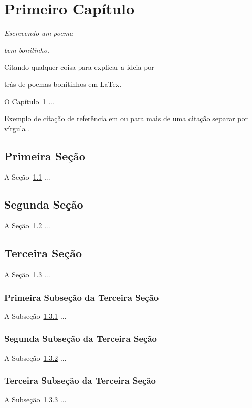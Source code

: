 \chapter{Primeiro Capítulo}
\label{cap:primeiro} 		%

\begin{flushright}	%
	\small
	\textit{Escrevendo um poema}
	
	\vspace{-3mm}
	\textit{bem bonitinho.}
		
	\vspace{-3mm} Citando qualquer coisa para explicar a ideia por
	
	\vspace{-3mm} trás de poemas bonitinhos em LaTex.
\end{flushright}

O Capítulo~\ref{cap:primeiro} ...

Exemplo de citação de referência em \cite{colherinhas2017} ou para mais de uma citação separar por vírgula \cite{colherinhas2017,morais2009,alvaro2015}.

\section{Primeira Seção}
\label{sec:primeiro_1}

A Seção~\ref{sec:primeiro_1} ...

\section{Segunda Seção}
\label{sec:primeiro_2}

A Seção~\ref{sec:primeiro_2} ...

\section{Terceira Seção}
\label{sec:primeiro_3}

A Seção~\ref{sec:primeiro_3} ...

\subsection{Primeira Subseção da Terceira Seção}
\label{subsec:primeiro_3.1}

A Subseção~\ref{subsec:primeiro_3.1} ...

\subsection{Segunda Subseção da Terceira Seção}
\label{subsec:primeiro_3.2}

A Subseção~\ref{subsec:primeiro_3.2} ...

\subsection{Terceira Subseção da Terceira Seção}
\label{subsec:primeiro_3.3}

A Subseção~\ref{subsec:primeiro_3.3} ...
